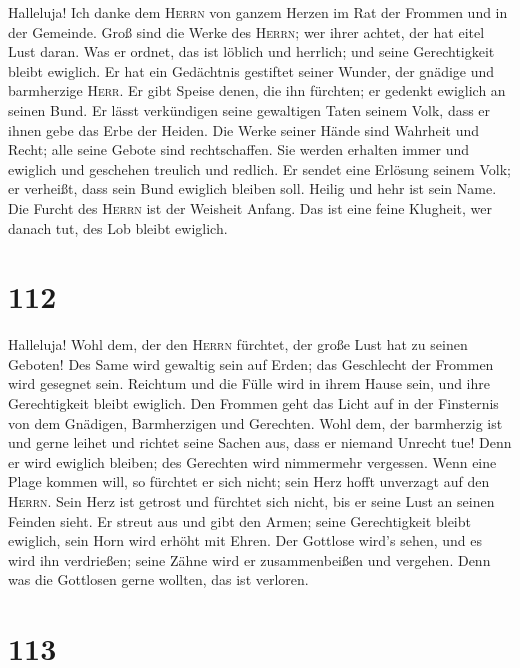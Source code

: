  Halleluja! Ich danke dem \textsc{Herrn} von ganzem Herzen
im Rat der Frommen und in der Gemeinde.  Groß sind die
Werke des \textsc{Herrn}; wer ihrer achtet, der hat eitel Lust daran.
 Was er ordnet, das ist löblich und herrlich; und seine
Gerechtigkeit bleibt ewiglich.  Er hat ein Gedächtnis
gestiftet seiner Wunder, der gnädige und barmherzige \textsc{Herr}.
 Er gibt Speise denen, die ihn fürchten; er gedenkt
ewiglich an seinen Bund.  Er lässt verkündigen seine
gewaltigen Taten seinem Volk, dass er ihnen gebe das Erbe der Heiden.
 Die Werke seiner Hände sind Wahrheit und Recht; alle
seine Gebote sind rechtschaffen.  Sie werden erhalten
immer und ewiglich und geschehen treulich und redlich.  Er
sendet eine Erlösung seinem Volk; er verheißt, dass sein Bund ewiglich
bleiben soll. Heilig und hehr ist sein Name.  Die Furcht
des \textsc{Herrn} ist der Weisheit Anfang. Das ist eine feine Klugheit,
wer danach tut, des Lob bleibt ewiglich.

\hypertarget{section-111}{%
\section{112}\label{section-111}}

 Halleluja! Wohl dem, der den \textsc{Herrn} fürchtet, der
große Lust hat zu seinen Geboten!  Des Same wird gewaltig
sein auf Erden; das Geschlecht der Frommen wird gesegnet sein.
 Reichtum und die Fülle wird in ihrem Hause sein, und ihre
Gerechtigkeit bleibt ewiglich.  Den Frommen geht das Licht
auf in der Finsternis von dem Gnädigen, Barmherzigen und Gerechten.
 Wohl dem, der barmherzig ist und gerne leihet und richtet
seine Sachen aus, dass er niemand Unrecht tue!  Denn er
wird ewiglich bleiben; des Gerechten wird nimmermehr vergessen.
 Wenn eine Plage kommen will, so fürchtet er sich nicht;
sein Herz hofft unverzagt auf den \textsc{Herrn}.  Sein
Herz ist getrost und fürchtet sich nicht, bis er seine Lust an seinen
Feinden sieht.  Er streut aus und gibt den Armen; seine
Gerechtigkeit bleibt ewiglich, sein Horn wird erhöht mit Ehren.
 Der Gottlose wird's sehen, und es wird ihn verdrießen;
seine Zähne wird er zusammenbeißen und vergehen. Denn was die Gottlosen
gerne wollten, das ist verloren.

\hypertarget{section-112}{%
\section{113}\label{section-112}}

